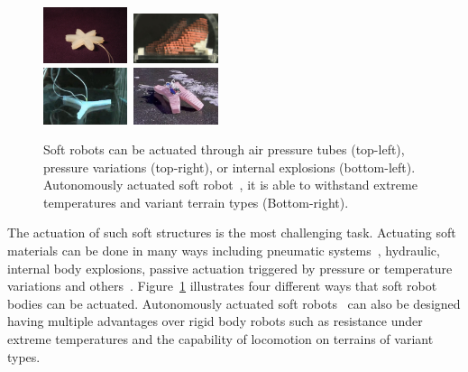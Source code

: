 \documentclass{sig-alternate}
\begin{document}
\begin{figure}[h!]
\centering
\includegraphics[width=0.22\textwidth,height=0.12\textheight]{../Figures/Misc/soft_robotics_figure.png}\		
\includegraphics[width=0.22\textwidth,height=0.12\textheight]{../Figures/Misc/hillerPressureChamber.png}\\[0.1cm]	
\includegraphics[width=0.22\textwidth,height=0.12\textheight]{../Figures/Misc/ExplodingRobot.jpg}\	
\includegraphics[width=0.22\textwidth,height=0.12\textheight]{../Figures/Misc/softbot.jpg}\\
\caption{Soft robots can be actuated through air pressure tubes (top-left), pressure variations (top-right), or internal explosions (bottom-left). Autonomously actuated soft robot~\cite{tolleyresilient}, it is able to withstand extreme temperatures and variant terrain types (Bottom-right).}
\label{fig:softRobotsActuation}
\end{figure}

The actuation of such soft structures is the most challenging task. Actuating soft materials can be done in many ways including pneumatic systems~\cite{ilievski2011soft, shepherd2011multigait}, hydraulic, internal body explosions, passive actuation triggered by pressure or temperature variations and others~\cite{laschi2012soft, seok2010peristaltic}. Figure~\ref{fig:softRobotsActuation} illustrates four different ways that soft robot bodies can be actuated. Autonomously actuated soft robots~\cite{tolleyresilient} can also be designed having multiple advantages over rigid body robots such as resistance under extreme temperatures and the capability of locomotion on terrains of variant types.
\end{document}
